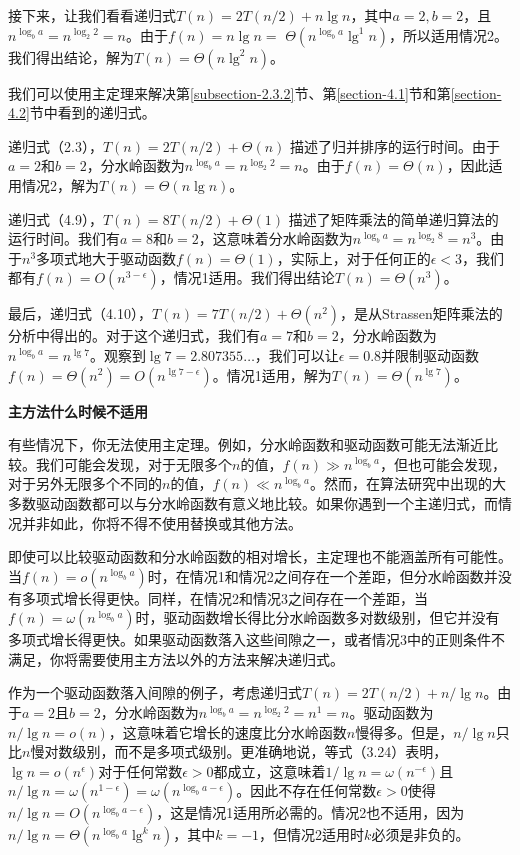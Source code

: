 \documentclass[lang=cn,newtx,10pt,scheme=chinese]{elegantbook}
\begin{document}
接下来，让我们看看递归式$T(n)=2 T(n / 2)+n \lg n$，其中$a=2, b=2$，且$n^{\log _b a}=n^{\log _2 2}=n$。由于$f(n)=n \lg n=$ $\Theta(n^{\log _b a} \lg ^1 n)$，所以适用情况2。我们得出结论，解为$T(n)=\Theta(n \lg ^2 n)$。

我们可以使用主定理来解决第\ref{subsection-2.3.2}节、第\ref{section-4.1}节和第\ref{section-4.2}节中看到的递归式。

递归式（2.3），$T(n)=2 T(n / 2)+\Theta(n)$ 描述了归并排序的运行时间。由于$a=2$和$b=2$，分水岭函数为$n^{\log _b a}=n^{\log _2 2}=n$。由于$f(n)=\Theta(n)$，因此适用情况2，解为$T(n)=\Theta(n \lg n)$。

递归式（4.9），$T(n)=8T(n/2)+\Theta(1)$ 描述了矩阵乘法的简单递归算法的运行时间。我们有$a=8$和$b=2$，这意味着分水岭函数为$n^{\log _b a}=n^{\log _2 8}=n^3$。由于$n^3$多项式地大于驱动函数$f(n)=\Theta(1)$，实际上，对于任何正的$\epsilon<3$，我们都有$f(n)=O(n^{3-\epsilon})$，情况1适用。我们得出结论$T(n)=\Theta(n^3)$。

最后，递归式（4.10），$T(n)=7 T(n / 2)+\Theta(n^2)$，是从Strassen矩阵乘法的分析中得出的。对于这个递归式，我们有$a=7$和$b=2$，分水岭函数为$n^{\log _b a}=n^{\lg 7}$。观察到$\lg 7=2.807355 \ldots$，我们可以让$\epsilon=0.8$并限制驱动函数$f(n)=\Theta(n^2)=O(n^{\lg 7-\epsilon})$。情况1适用，解为$T(n)=\Theta(n^{\lg 7})$。

\textbf{主方法什么时候不适用}

有些情况下，你无法使用主定理。例如，分水岭函数和驱动函数可能无法渐近比较。我们可能会发现，对于无限多个$n$的值，$f(n) \gg n^{\log _b a}$，但也可能会发现，对于另外无限多个不同的$n$的值，$f(n) \ll n^{\log _b a}$。然而，在算法研究中出现的大多数驱动函数都可以与分水岭函数有意义地比较。如果你遇到一个主递归式，而情况并非如此，你将不得不使用替换或其他方法。

即使可以比较驱动函数和分水岭函数的相对增长，主定理也不能涵盖所有可能性。当$f(n)=o(n^{\log _b a})$时，在情况1和情况2之间存在一个差距，但分水岭函数并没有多项式增长得更快。同样，在情况2和情况3之间存在一个差距，当$f(n)=\omega(n^{\log _b a})$时，驱动函数增长得比分水岭函数多对数级别，但它并没有多项式增长得更快。如果驱动函数落入这些间隙之一，或者情况3中的正则条件不满足，你将需要使用主方法以外的方法来解决递归式。

作为一个驱动函数落入间隙的例子，考虑递归式$T(n)=2T(n/2)+n/\lg n$。由于$a=2$且$b=2$，分水岭函数为$n^{\log _b a}=n^{\log _2 2}=n^1=n$。驱动函数为$n / \lg n=o(n)$，这意味着它增长的速度比分水岭函数$n$慢得多。但是，$n / \lg n$只比$n$慢对数级别，而不是多项式级别。更准确地说，等式（3.24）表明，$\lg n=o(n^\epsilon)$对于任何常数$\epsilon>0$都成立，这意味着$1 / \lg n=\omega(n^{-\epsilon})$且$n / \lg n=\omega(n^{1-\epsilon})=\omega(n^{\log _b a-\epsilon})$。因此不存在任何常数$\epsilon>0$使得$n / \lg n=O(n^{\log _b a-\epsilon})$，这是情况1适用所必需的。情况2也不适用，因为$n / \lg n=\Theta(n^{\log _b a} \lg ^k n)$，其中$k=-1$，但情况2适用时$k$必须是非负的。
\end{document}
